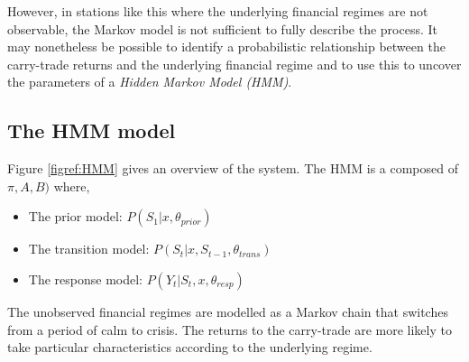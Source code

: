 \documentclass[12pt, a4paper, oneside]{article} %
\begin{document}
However, in stations like this where the underlying financial regimes are not observable, the Markov model is not sufficient to fully describe the process. It may nonetheless be possible to identify a probabilistic relationship between the carry-trade returns and the underlying financial regime and to use this to uncover the parameters of a \emph{Hidden Markov Model (HMM)}. 
 
\subsection{The HMM model}
Figure \ref{figref:HMM} gives an overview of the system.  The HMM is a composed of $\pi, A, B)$ where,

\begin{itemize}
\item The prior model: $P(S_1|x, \theta_{prior})$
\item The transition model: $P(S_t|x, S_{t-1}, \theta_{trans})$
\item The response model: $P(Y_t| S_t, x, \theta_{resp})$
\end{itemize}

The unobserved financial regimes are modelled as a Markov chain that switches from a period of calm to crisis.  The returns to the carry-trade are more likely to take particular characteristics according to the underlying regime.   
\end{document}

